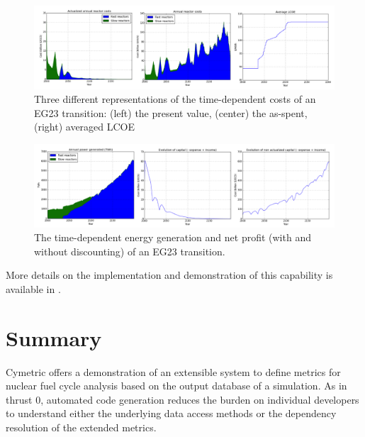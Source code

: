 \begin{figure}[htbp]
  \centering
  \includegraphics[width=\columnwidth]{./images/econ-eg23-1}
  \caption[Time dependent costs for EG23 fuel cycle transition.]{Three
    different representations of the time-dependent costs of an EG23
    transition: (left) the present value, (center) the as-spent, (right)
    averaged \gls{LCOE}}
  \label{fig:econ-eg23-1}
\end{figure}

\begin{figure}[htbp]
  \centering
  \includegraphics[width=\columnwidth]{./images/econ-eg23-2}
  \caption[Time dependent energy generation and net profit for EG23 fuel cycle
    transition.]{The time-dependent energy generation and net profit (with and
    without discounting) of an EG23 transition.}
  \label{fig:econ-eg23-2}
\end{figure}


More details on the implementation and demonstration of this capability is
available in .  

\section{Summary}

Cymetric offers a demonstration of an extensible system to define metrics for
nuclear fuel cycle analysis based on the output database of a \Cyclus
simulation.  As in thrust 0, automated code generation reduces the burden on
individual developers to understand either the underlying data access methods
or the dependency resolution of the extended metrics.
